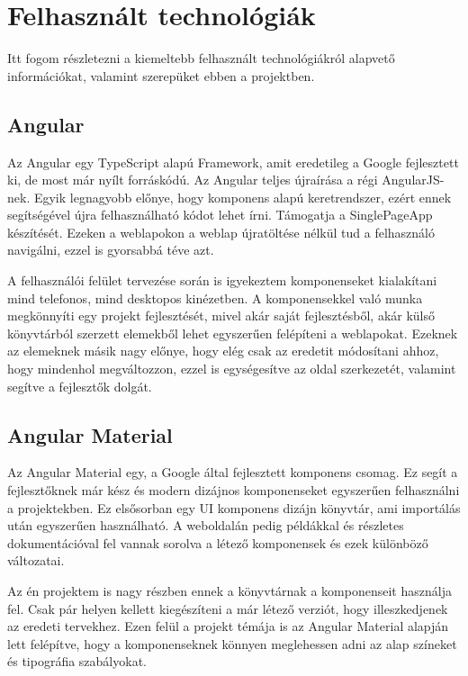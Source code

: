 \documentclass[12pt]{report}
\theoremstyle{definition}
\begin{document}
\chapter{Felhasznált technológiák}
Itt fogom részletezni a kiemeltebb felhasznált technológiákról alapvető információkat, valamint szerepüket ebben a projektben.

\section{Angular}
Az Angular egy \Gls{TypeScript} alapú \Gls{Framework}, amit  eredetileg a Google fejlesztett ki, de most már nyílt forráskódú. Az Angular teljes újraírása a régi \Gls{AngularJS}-nek. Egyik legnagyobb előnye, hogy komponens alapú keretrendszer, ezért ennek segítségével újra felhasználható kódot lehet írni. Támogatja a \Gls{SinglePageApp} készítését. Ezeken a weblapokon a weblap újratöltése nélkül tud a felhasználó navigálni, ezzel is gyorsabbá téve azt.

A felhasználói felület tervezése során is igyekeztem komponenseket kialakítani mind telefonos, mind desktopos kinézetben. A komponensekkel való munka megkönnyíti egy projekt fejlesztését, mivel akár saját fejlesztésből, akár külső könyvtárból szerzett elemekből lehet egyszerűen felépíteni a weblapokat. Ezeknek az elemeknek másik nagy előnye, hogy elég csak az eredetit módosítani ahhoz, hogy mindenhol megváltozzon, ezzel is egységesítve az oldal szerkezetét, valamint segítve a fejlesztők dolgát.


\section{Angular Material} 
Az Angular Material egy, a Google által fejlesztett komponens csomag. 
Ez segít a fejlesztőknek már kész és modern dizájnos komponenseket egyszerűen felhasználni a projektekben. 
Ez elsősorban egy UI komponens dizájn könyvtár, ami importálás után egyszerűen használható. 
A weboldalán pedig példákkal és részletes dokumentációval fel vannak sorolva a létező komponensek és ezek különböző változatai.

Az én projektem is nagy részben ennek a könyvtárnak a komponenseit használja fel. 
Csak pár helyen kellett kiegészíteni a már létező verziót, hogy illeszkedjenek az eredeti tervekhez. 
Ezen felül a projekt témája is az Angular Material alapján lett felépítve, hogy a komponenseknek könnyen meglehessen adni az alap színeket és tipográfia szabályokat.
\end{document}
